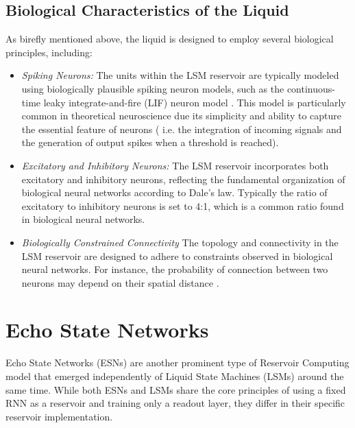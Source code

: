 \documentclass[a4paper,12pt]{report}
\begin{document}
\subsection*{Biological Characteristics of the Liquid}
As birefly mentioned above, the liquid is designed to employ several biological principles,
including:
\begin{itemize}
  \item \emph{Spiking Neurons:}
    The units within the LSM reservoir are typically modeled using biologically plausible 
    spiking neuron models, such as the continuous-time leaky integrate-and-fire (LIF) 
    neuron model \cite{TANAKA2019100}. 
    This model is particularly common in theoretical neuroscience
    due its simplicity and ability to capture the essential feature of neurons (
    i.e. the integration of incoming signals and the generation of output 
    spikes when a threshold is reached). 
  \item \emph{Excitatory and Inhibitory Neurons:}
    The LSM reservoir incorporates both excitatory and inhibitory neurons, reflecting 
    the fundamental organization of biological neural networks according to Dale's law.
    Typically the ratio of excitatory to inhibitory neurons is set to 4:1, which is a
    common ratio found in biological neural networks.
  \item \emph{Biologically Constrained Connectivity}
    The topology and connectivity in the LSM reservoir are designed to adhere to 
    constraints observed in biological neural networks. For instance, the probability 
    of connection between two neurons may depend on their spatial distance 
    \cite{TANAKA2019100}.
\end{itemize}

\section{Echo State Networks}

Echo State Networks (ESNs) are another prominent type of Reservoir Computing model that 
emerged independently of Liquid State Machines (LSMs) around the same time. While both 
ESNs and LSMs share the core principles of using a fixed RNN as a 
reservoir and training only a readout layer, they differ in their specific reservoir 
implementation.
\vspace{0.5em}
\end{document}
